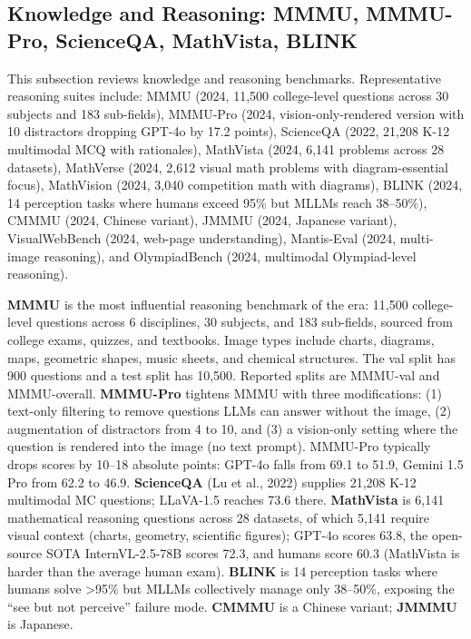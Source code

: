 \documentclass{article}
\begin{document}
\subsection{Knowledge and Reasoning: MMMU, MMMU-Pro, ScienceQA, MathVista, BLINK}\label{knowledge-and-reasoning-mmmu-mmmu-pro-scienceqa-mathvista-blink}

This subsection reviews knowledge and reasoning benchmarks. Representative reasoning suites include: MMMU (2024, 11,500 college-level questions across 30 subjects and 183 sub-fields), MMMU-Pro (2024, vision-only-rendered version with 10 distractors dropping GPT-4o by 17.2 points), ScienceQA (2022, 21,208 K-12 multimodal MCQ with rationales), MathVista (2024, 6,141 problems across 28 datasets), MathVerse (2024, 2,612 visual math problems with diagram-essential focus), MathVision (2024, 3,040 competition math with diagrams), BLINK (2024, 14 perception tasks where humans exceed 95\% but MLLMs reach 38--50\%), CMMMU (2024, Chinese variant), JMMMU (2024, Japanese variant), VisualWebBench (2024, web-page understanding), Mantis-Eval (2024, multi-image reasoning), and OlympiadBench (2024, multimodal Olympiad-level reasoning).

\textbf{MMMU} \citep{yue20242024} is the most influential reasoning benchmark of the era: 11,500 college-level questions across 6 disciplines, 30 subjects, and 183 sub-fields, sourced from college exams, quizzes, and textbooks. Image types include charts, diagrams, maps, geometric shapes, music sheets, and chemical structures. The val split has 900 questions and a test split has 10,500. Reported splits are MMMU-val and MMMU-overall. \textbf{MMMU-Pro} \citep{yue20242024} tightens MMMU with three modifications: (1) text-only filtering to remove questions LLMs can answer without the image, (2) augmentation of distractors from 4 to 10, and (3) a vision-only setting where the question is rendered into the image (no text prompt). MMMU-Pro typically drops scores by 10--18 absolute points: GPT-4o falls from 69.1 to 51.9, Gemini 1.5 Pro from 62.2 to 46.9. \textbf{ScienceQA} (Lu et al., 2022) supplies 21,208 K-12 multimodal MC questions; LLaVA-1.5 reaches 73.6 there. \textbf{MathVista} \citep{lu20242024} is 6,141 mathematical reasoning questions across 28 datasets, of which 5,141 require visual context (charts, geometry, scientific figures); GPT-4o scores 63.8, the open-source SOTA InternVL-2.5-78B scores 72.3, and humans score 60.3 (MathVista is harder than the average human exam). \textbf{BLINK} \citep{fu20242024} is 14 perception tasks where humans solve \textgreater95\% but MLLMs collectively manage only 38--50\%, exposing the ``see but not perceive'' failure mode. \textbf{CMMMU} is a Chinese variant; \textbf{JMMMU} is Japanese.
\end{document}

